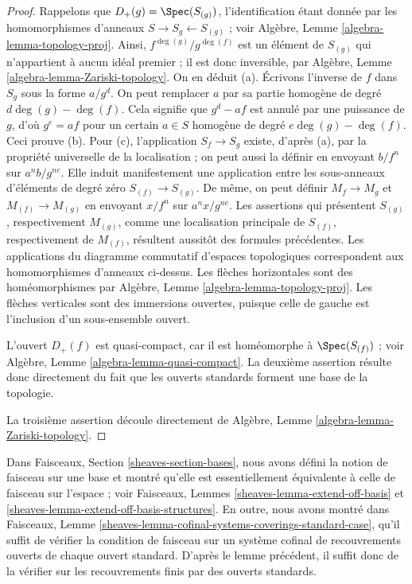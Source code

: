 \begin{proof}
Rappelons que $D_{+}(g) = \Spec(S_{(g)})$, l'identification étant donnée par
les homomorphismes d'anneaux $S \to S_g \leftarrow S_{(g)}$ ; voir
Algèbre, Lemme \ref{algebra-lemma-topology-proj}.
Ainsi, $f^{\deg(g)}/g^{\deg(f)}$ est un élément de $S_{(g)}$ qui n'appartient
à aucun idéal premier ; il est donc inversible, par
Algèbre, Lemme \ref{algebra-lemma-Zariski-topology}.
On en déduit (a).
Écrivons l'inverse de $f$ dans $S_g$ sous la forme $a/g^d$.
On peut remplacer $a$ par sa partie homogène de degré
$d\deg(g) - \deg(f)$.
Cela signifie que $g^d - af$ est annulé par une puissance de $g$, d'où
$g^e = af$ pour un certain $a \in S$ homogène de degré
$e\deg(g) - \deg(f)$. Ceci prouve (b).
Pour (c), l'application $S_f \to S_g$ existe, d'après (a), par la propriété
universelle de la localisation ; on peut aussi la définir en envoyant $b/f^n$
sur $a^nb/g^{ne}$. Elle induit manifestement une application entre les
sous-anneaux d'éléments de degré zéro $S_{(f)} \to S_{(g)}$.
De même, on peut définir $M_f \to M_g$ et $M_{(f)} \to M_{(g)}$ en envoyant
$x/f^n$ sur $a^nx/g^{ne}$. Les assertions qui présentent $S_{(g)}$,
respectivement $M_{(g)}$, comme une localisation principale de $S_{(f)}$,
respectivement de $M_{(f)}$, résultent aussitôt des formules précédentes.
Les applications du diagramme commutatif d'espaces topologiques correspondent
aux homomorphismes d'anneaux ci-dessus. Les flèches horizontales sont des
homéomorphismes par Algèbre, Lemme \ref{algebra-lemma-topology-proj}.
Les flèches verticales sont des immersions ouvertes, puisque celle de gauche
est l'inclusion d'un sous-ensemble ouvert.

\medskip\noindent
L'ouvert $D_{+}(f)$ est quasi-compact, car il est homéomorphe à
$\Spec(S_{(f)})$ ; voir Algèbre, Lemme \ref{algebra-lemma-quasi-compact}.
La deuxième assertion résulte donc directement du fait que les ouverts
standards forment une base de la topologie.

\medskip\noindent
La troisième assertion découle directement de
Algèbre, Lemme \ref{algebra-lemma-Zariski-topology}.
\end{proof}

\noindent
Dans Faisceaux, Section \ref{sheaves-section-bases}, nous avons défini
la notion de faisceau sur une base et montré qu'elle est essentiellement
équivalente à celle de faisceau sur l'espace ; voir Faisceaux, Lemmes
\ref{sheaves-lemma-extend-off-basis} et
\ref{sheaves-lemma-extend-off-basis-structures}. En outre, nous avons montré
dans Faisceaux, Lemme
\ref{sheaves-lemma-cofinal-systems-coverings-standard-case}, qu'il suffit de
vérifier la condition de faisceau sur un système cofinal de recouvrements
ouverts de chaque ouvert standard. D'après le lemme précédent, il suffit donc
de la vérifier sur les recouvrements finis par des ouverts standards.


